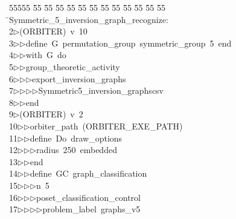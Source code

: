 %
%
\begin{tabbing}
55555 \= 55 \= 55 \= 55 \= 55 \= 55 \= 55 \= 55 \= 55 \= 55 \= 55 \= 55 \= 55 \= \>Symmetric\_5\_inversion\_graph\_recognize:\\[0pt]
2\>$\triangleright$\>(ORBITER)\ v\ 10\ \\[0pt]
3\>$\triangleright$\>$\triangleright$\>define\ G\ permutation\_group\ symmetric\_group\ 5\ end\ \\[0pt]
4\>$\triangleright$\>$\triangleright$\>with\ G\ do\ \\[0pt]
5\>$\triangleright$\>$\triangleright$\>group\_theoretic\_activity\ \\[0pt]
6\>$\triangleright$\>$\triangleright$\>$\triangleright$\>export\_inversion\_graphs\ \\[0pt]
7\>$\triangleright$\>$\triangleright$\>$\triangleright$\>$\triangleright$\>Symmetric5\_inversion\_graphscsv\ \\[0pt]
8\>$\triangleright$\>$\triangleright$\>end\\[0pt]
9\>$\triangleright$\>(ORBITER)\ v\ 2\ \\[0pt]
10\>$\triangleright$\>$\triangleright$\>orbiter\_path\ (ORBITER\_EXE\_PATH)\ \\[0pt]
11\>$\triangleright$\>$\triangleright$\>define\ Do\ draw\_options\ \\[0pt]
12\>$\triangleright$\>$\triangleright$\>$\triangleright$\>radius\ 250\ embedded\ \\[0pt]
13\>$\triangleright$\>$\triangleright$\>end\ \\[0pt]
14\>$\triangleright$\>$\triangleright$\>define\ GC\ graph\_classification\ \\[0pt]
15\>$\triangleright$\>$\triangleright$\>$\triangleright$\>n\ 5\ \\[0pt]
16\>$\triangleright$\>$\triangleright$\>$\triangleright$\>poset\_classification\_control\ \\[0pt]
17\>$\triangleright$\>$\triangleright$\>$\triangleright$\>$\triangleright$\>problem\_label\ graphs\_v5\ \\[0pt]

\end{tabbing}
